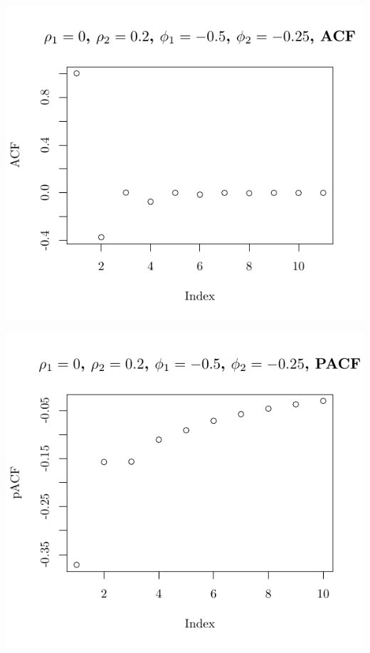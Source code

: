 \documentclass[10pt]{paper}\usepackage[]{graphicx}\usepackage[]{color}
\makeatletter
\def\maxwidth{ %
  \ifdim\Gin@nat@width>\linewidth
    \linewidth
  \else
    \Gin@nat@width
  \fi
}
\newenvironment{knitrout}{}{} %
\makeatother
\begin{document}
\begin{knitrout}
{\centering \includegraphics[width=\maxwidth]{figure/graphics-plotter-81} 

}




{\centering \includegraphics[width=\maxwidth]{figure/graphics-plotter-82} 

}





\end{knitrout}
\end{document}
